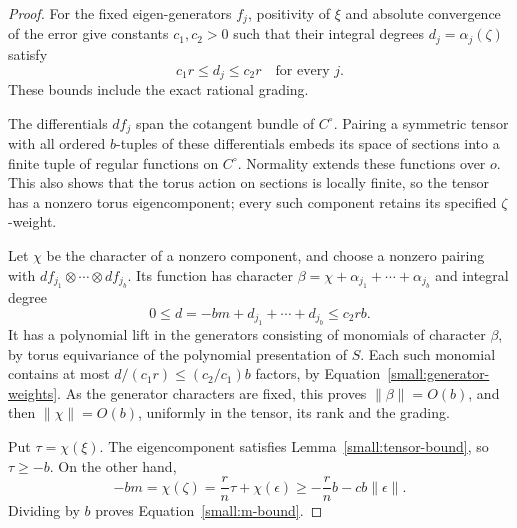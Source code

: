 \begin{proof}
For the fixed eigen-generators \(f_j\), positivity of \(\xi\) and
absolute convergence of the error give constants \(c_1,c_2>0\)
such that their integral degrees \(d_j=\alpha_j(\zeta)\) satisfy
\begin{equation}
 c_1r\leq d_j\leq c_2r
 \quad\text{for every }j.
 \label{small:generator-weights}
\end{equation}
These bounds include the exact rational grading.

The differentials \(df_j\) span the cotangent bundle of \(C^\circ\).
Pairing a symmetric tensor with all ordered \(b\)-tuples of these
differentials embeds its space of sections into a finite tuple of
regular functions on \(C^\circ\).  Normality extends these functions
over \(o\).  This also shows that the torus action on sections is
locally finite, so the tensor has a nonzero torus eigencomponent;
every such component retains its specified \(\zeta\)-weight.

Let \(\chi\) be the character of a nonzero component, and choose a
nonzero pairing with
\(df_{j_1}\otimes\cdots\otimes df_{j_b}\).  Its function has
character
\(\beta=\chi+\alpha_{j_1}+\cdots+\alpha_{j_b}\) and integral degree
\[
 0\leq d=-bm+d_{j_1}+\cdots+d_{j_b}\leq c_2rb.
\]
It has a polynomial lift in the generators consisting of monomials
of character \(\beta\), by torus equivariance of the polynomial
presentation of \(S\).  Each such monomial contains at most
\(d/(c_1r)\leq(c_2/c_1)b\) factors, by
Equation~\eqref{small:generator-weights}.  As the generator
characters are fixed, this proves \(\|\beta\|=O(b)\), and then
\(\|\chi\|=O(b)\), uniformly in the tensor, its rank and the
grading.

Put \(\tau=\chi(\xi)\).  The eigencomponent satisfies
Lemma~\ref{small:tensor-bound}, so \(\tau\geq-b\).  On the other
hand,
\[
 -bm=\chi(\zeta)=\frac rn\tau+\chi(\epsilon)
 \geq-\frac rn b-cb\|\epsilon\|.
\]
Dividing by \(b\) proves Equation~\eqref{small:m-bound}.
\end{proof}

